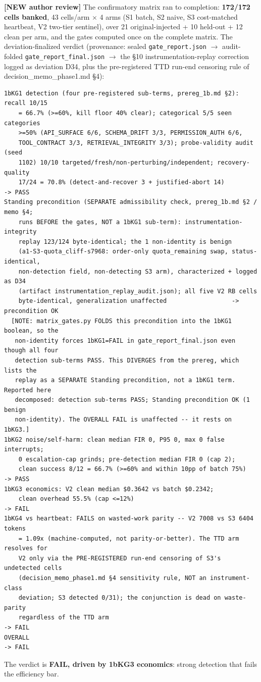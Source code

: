 \documentclass[acmsmall,screen,review,anonymous]{acmart}
\renewenvironment{leftbar}{%
  \def\FrameCommand{\hspace{2pt}{\color{lbcol}\vrule width 1.5pt}\hspace{8pt}}%
  \MakeFramed{\advance\hsize-\width \FrameRestore}\small}%
  {\endMakeFramed}
\begin{document}
\begin{leftbar}
\textbf{[NEW \textperiodcentered{} author review]} The confirmatory matrix ran to completion: \textbf{172/172 cells banked}, 43 cells/arm $\times$ 4 arms (S1 batch, S2 naive, S3 cost-matched heartbeat, V2 two-tier sentinel), over 21 original-injected + 10 held-out + 12 clean per arm, and the gates computed once on the complete matrix. The deviation-finalized verdict (provenance: sealed \texttt{gate\_report.json} $\rightarrow$ audit-folded \texttt{gate\_report\_final.json} $\rightarrow$ the \S10 instrumentation-replay correction logged as deviation D34, plus the pre-registered TTD run-end censoring rule of decision\_memo\_phase1.md \S4):

\begin{lstlisting}
1bKG1 detection (four pre-registered sub-terms, prereg_1b.md §2): recall 10/15
    = 66.7% (>=60%, kill floor 40% clear); categorical 5/5 seen categories
    >=50% (API_SURFACE 6/6, SCHEMA_DRIFT 3/3, PERMISSION_AUTH 6/6,
    TOOL_CONTRACT 3/3, RETRIEVAL_INTEGRITY 3/3); probe-validity audit (seed
    1102) 10/10 targeted/fresh/non-perturbing/independent; recovery-quality
    17/24 = 70.8% (detect-and-recover 3 + justified-abort 14)            -> PASS
Standing precondition (SEPARATE admissibility check, prereg_1b.md §2 / memo §4;
    runs BEFORE the gates, NOT a 1bKG1 sub-term): instrumentation-integrity
    replay 123/124 byte-identical; the 1 non-identity is benign
    (a1-S3-quota_cliff-s7968: order-only quota_remaining swap, status-identical,
    non-detection field, non-detecting S3 arm), characterized + logged as D34
    (artifact instrumentation_replay_audit.json); all five V2 RB cells
    byte-identical, generalization unaffected                  -> precondition OK
  [NOTE: matrix_gates.py FOLDS this precondition into the 1bKG1 boolean, so the
   non-identity forces 1bKG1=FAIL in gate_report_final.json even though all four
   detection sub-terms PASS. This DIVERGES from the prereg, which lists the
   replay as a SEPARATE Standing precondition, not a 1bKG1 term. Reported here
   decomposed: detection sub-terms PASS; Standing precondition OK (1 benign
   non-identity). The OVERALL FAIL is unaffected -- it rests on 1bKG3.]
1bKG2 noise/self-harm: clean median FIR 0, P95 0, max 0 false interrupts;
    0 escalation-cap grinds; pre-detection median FIR 0 (cap 2);
    clean success 8/12 = 66.7% (>=60% and within 10pp of batch 75%)      -> PASS
1bKG3 economics: V2 clean median $0.3642 vs batch $0.2342;
    clean overhead 55.5% (cap <=12%)                                     -> FAIL
1bKG4 vs heartbeat: FAILS on wasted-work parity -- V2 7008 vs S3 6404 tokens
    = 1.09x (machine-computed, not parity-or-better). The TTD arm resolves for
    V2 only via the PRE-REGISTERED run-end censoring of S3's undetected cells
    (decision_memo_phase1.md §4 sensitivity rule, NOT an instrument-class
    deviation; S3 detected 0/31); the conjunction is dead on waste-parity
    regardless of the TTD arm                                            -> FAIL
OVERALL                                                                  -> FAIL
\end{lstlisting}
The verdict is \textbf{FAIL, driven by 1bKG3 economics}: strong detection that fails the efficiency bar.


\end{leftbar}
\end{document}
